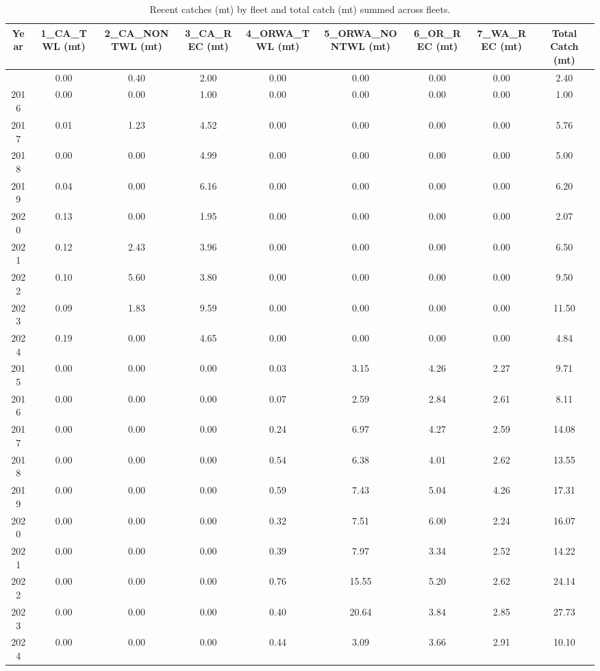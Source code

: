 \documentclass[
]{scrartcl}
\begin{document}
\begin{longtable}{ccccccccc}

\caption{\label{tbl-es-catches}Recent catches (mt) by fleet and total
catch (mt) summed across fleets.}

\tabularnewline

\toprule
Year & 1\_CA\_TWL (mt) & 2\_CA\_NONTWL (mt) & 3\_CA\_REC (mt) & 4\_ORWA\_TWL (mt) & 5\_ORWA\_NONTWL (mt) & 6\_OR\_REC (mt) & 7\_WA\_REC (mt) & Total Catch (mt) \\ 
\midrule\addlinespace[2.5pt]
2015 & 0.00 & 0.40 & 2.00 & 0.00 & 0.00 & 0.00 & 0.00 & 2.40 \\ 
2016 & 0.00 & 0.00 & 1.00 & 0.00 & 0.00 & 0.00 & 0.00 & 1.00 \\ 
2017 & 0.01 & 1.23 & 4.52 & 0.00 & 0.00 & 0.00 & 0.00 & 5.76 \\ 
2018 & 0.00 & 0.00 & 4.99 & 0.00 & 0.00 & 0.00 & 0.00 & 5.00 \\ 
2019 & 0.04 & 0.00 & 6.16 & 0.00 & 0.00 & 0.00 & 0.00 & 6.20 \\ 
2020 & 0.13 & 0.00 & 1.95 & 0.00 & 0.00 & 0.00 & 0.00 & 2.07 \\ 
2021 & 0.12 & 2.43 & 3.96 & 0.00 & 0.00 & 0.00 & 0.00 & 6.50 \\ 
2022 & 0.10 & 5.60 & 3.80 & 0.00 & 0.00 & 0.00 & 0.00 & 9.50 \\ 
2023 & 0.09 & 1.83 & 9.59 & 0.00 & 0.00 & 0.00 & 0.00 & 11.50 \\ 
2024 & 0.19 & 0.00 & 4.65 & 0.00 & 0.00 & 0.00 & 0.00 & 4.84 \\ 
2015 & 0.00 & 0.00 & 0.00 & 0.03 & 3.15 & 4.26 & 2.27 & 9.71 \\ 
2016 & 0.00 & 0.00 & 0.00 & 0.07 & 2.59 & 2.84 & 2.61 & 8.11 \\ 
2017 & 0.00 & 0.00 & 0.00 & 0.24 & 6.97 & 4.27 & 2.59 & 14.08 \\ 
2018 & 0.00 & 0.00 & 0.00 & 0.54 & 6.38 & 4.01 & 2.62 & 13.55 \\ 
2019 & 0.00 & 0.00 & 0.00 & 0.59 & 7.43 & 5.04 & 4.26 & 17.31 \\ 
2020 & 0.00 & 0.00 & 0.00 & 0.32 & 7.51 & 6.00 & 2.24 & 16.07 \\ 
2021 & 0.00 & 0.00 & 0.00 & 0.39 & 7.97 & 3.34 & 2.52 & 14.22 \\ 
2022 & 0.00 & 0.00 & 0.00 & 0.76 & 15.55 & 5.20 & 2.62 & 24.14 \\ 
2023 & 0.00 & 0.00 & 0.00 & 0.40 & 20.64 & 3.84 & 2.85 & 27.73 \\ 
2024 & 0.00 & 0.00 & 0.00 & 0.44 & 3.09 & 3.66 & 2.91 & 10.10 \\ 
\bottomrule

\end{longtable}
\end{document}
